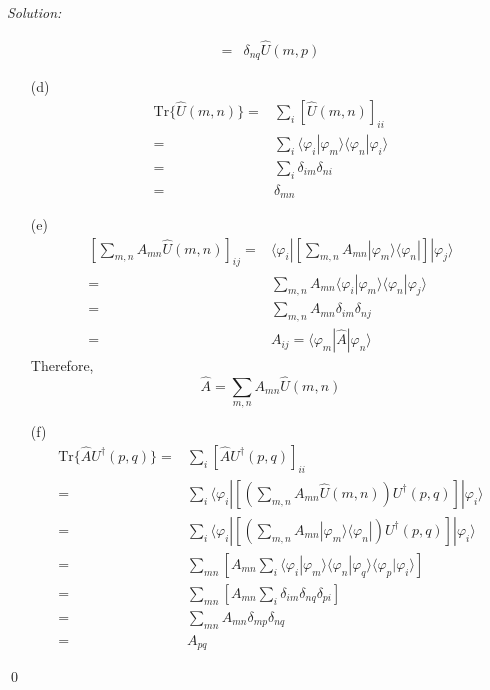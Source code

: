 \documentclass[12pt,a4paper]{article}
\newenvironment{sol}
    {\emph{Solution:}
    }
    {
    \qed
    }
\begin{document}
\begin{sol}
\begin{itemize}
\begin{align}
=&\delta_{nq}\hat{U}(m,p)
\end{align}
\item[(d)]
\begin{align}
\nonumber\text{Tr}\{\hat{U}(m,n)\}=&\sum_i[\hat{U}(m,n)]_{ii}\\
\nonumber=&\sum_i\langle\varphi_i|\varphi_m\rangle\langle\varphi_n|\varphi_i\rangle\\
\nonumber=&\sum_i\delta_{im}\delta_{ni}\\
=&\delta_{mn}
\end{align}
\item[(e)]
\begin{align}
\nonumber\left[\sum_{m,n}A_{mn}\hat{U}(m,n)\right]_{ij}=&\langle\varphi_i|\left[\sum_{m,n}A_{mn}|\varphi_m\rangle\langle\varphi_n|\right]|\varphi_j\rangle\\
\nonumber=&\sum_{m,n}A_{mn}\langle\varphi_i|\varphi_m\rangle\langle\varphi_n|\varphi_j\rangle\\
\nonumber=&\sum_{m,n}A_{mn}\delta_{im}\delta_{nj}\\
=&A_{ij}=\langle\varphi_m|\hat{A}|\varphi_n\rangle
\end{align}
Therefore,
\begin{equation}
\hat{A}=\sum_{m,n}A_{mn}\hat{U}(m,n)
\end{equation}
\item[(f)]
\begin{align}
\nonumber\text{Tr}\{\hat{A}U^{\dagger}(p,q)\}=&\sum_i[\hat{A}U^{\dagger}(p,q)]_{ii}\\
\nonumber=&\sum_i\langle\varphi_i|\left[\left(\sum_{m,n}A_{mn}\hat{U}(m,n)\right)U^{\dagger}(p,q)\right]|\varphi_i\rangle\\
\nonumber=&\sum_i\langle\varphi_i|\left[\left(\sum_{m,n}A_{mn}|\varphi_m\rangle\langle\varphi_n|\right)U^{\dagger}(p,q)\right]|\varphi_i\rangle\\
\nonumber=&\sum_{mn}\left[A_{mn}\sum_i\langle\varphi_i|\varphi_m\rangle\langle\varphi_n|\varphi_q\rangle\langle\varphi_p|\varphi_i\rangle\right]\\
\nonumber=&\sum_{mn}\left[A_{mn}\sum_i\delta_{im}\delta_{nq}\delta_{pi}\right]\\
\nonumber=&\sum_{mn}A_{mn}\delta_{mp}\delta_{nq}\\
=&A_{pq}
\end{align}
\end{itemize}
\end{sol}
\end{document}
